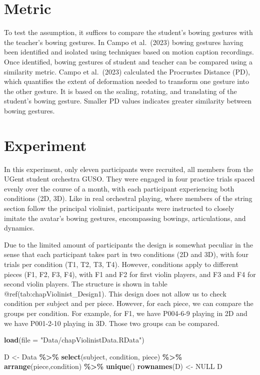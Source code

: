 \documentclass[
]{book}
\newenvironment{Shaded}{\begin{snugshade}}{\end{snugshade}}
\newcommand{\AttributeTok}[1]{\textcolor[rgb]{0.13,0.29,0.53}{#1}}
\newcommand{\ConstantTok}[1]{\textcolor[rgb]{0.56,0.35,0.01}{#1}}
\newcommand{\FunctionTok}[1]{\textcolor[rgb]{0.13,0.29,0.53}{\textbf{#1}}}
\newcommand{\NormalTok}[1]{#1}
\newcommand{\OtherTok}[1]{\textcolor[rgb]{0.56,0.35,0.01}{#1}}
\newcommand{\SpecialCharTok}[1]{\textcolor[rgb]{0.81,0.36,0.00}{\textbf{#1}}}
\newcommand{\StringTok}[1]{\textcolor[rgb]{0.31,0.60,0.02}{#1}}
\theoremstyle{definition}
\theoremstyle{definition}
\theoremstyle{definition}
\theoremstyle{definition}
\theoremstyle{remark}
\begin{document}
\hypertarget{metric}{%
\section{Metric}\label{metric}}

To test the assumption, it suffices to compare the student's bowing gestures with the teacher's bowing gestures. In Campo et al.~(2023) bowing gestures having been identified and isolated using techniques based on motion caption recordings. Once identified, bowing gestures of student and teacher can be compared using a similarity metric. Campo et al.~(2023) calculated the Procrustes Distance (PD), which quantifies the extent of deformation needed to transform one gesture into the other gesture. It is based on the scaling, rotating, and translating of the student's bowing gesture. Smaller PD values indicates greater similarity between bowing gestures.

\hypertarget{experiment}{%
\section{Experiment}\label{experiment}}

In this experiment, only eleven participants were recruited, all members from the UGent student orchestra GUSO.
They were engaged in four practice trials spaced evenly over the course of a month, with each participant experiencing both conditions (2D, 3D). Like in real orchestral playing, where members of the string section follow the principal violinist, participants were instructed to closely imitate the avatar's bowing gestures, encompassing bowings, articulations, and dynamics.

Due to the limited amount of participants the design is somewhat peculiar in the sense that
each participant takes part in two conditions (2D and 3D), with four trials per condition (T1, T2, T3, T4).
However, conditions apply to different pieces (F1, F2, F3, F4), with F1 and F2 for first violin players, and F3 and F4 for second violin players. The structure is shown in table @ref(tab:chapViolinist\_Design1).
This design does not allow us to check condition per subject and per piece.
However, for each piece, we can compare the groups per condition.
For example, for F1, we have P004-6-9 playing in 2D and we have P001-2-10 playing in 3D.
Those two groups can be compared.

\begin{Shaded}
\begin{Highlighting}[]
\FunctionTok{load}\NormalTok{(}\AttributeTok{file =} \StringTok{"Data/chapViolinistData.RData"}\NormalTok{)}

\NormalTok{D }\OtherTok{\textless{}{-}}\NormalTok{ Data }\SpecialCharTok{\%\textgreater{}\%} \FunctionTok{select}\NormalTok{(subject, condition, piece) }\SpecialCharTok{\%\textgreater{}\%} \FunctionTok{arrange}\NormalTok{(piece,condition) }\SpecialCharTok{\%\textgreater{}\%} \FunctionTok{unique}\NormalTok{()}
\FunctionTok{rownames}\NormalTok{(D) }\OtherTok{\textless{}{-}} \ConstantTok{NULL}
\NormalTok{D}
\end{Highlighting}
\end{Shaded}
\end{document}
